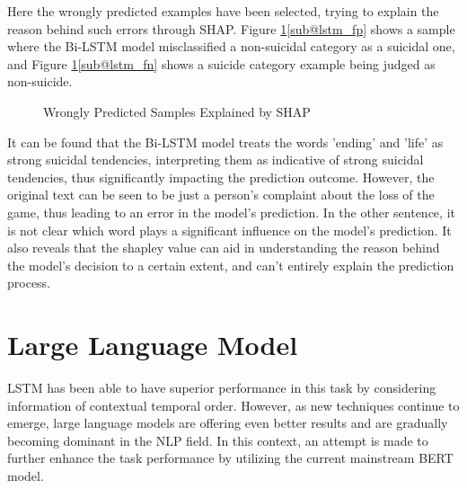 \documentclass[ %
                    author={Bocheng Wang},
                supervisor={Dr. Qiang Liu},
                    degree={MSc},
                     title={A Research on Identification of Suicide Ideation in Texts with Multiple Models},
                      type={},
                      year={2024}]{dissertation}
\begin{document}
Here the wrongly predicted examples have been selected, trying to explain the reason behind such errors through SHAP. Figure \ref{fig:lstmshap}\ref{sub@lstm_fp} shows a sample where the Bi-LSTM model misclassified a non-suicidal category as a suicidal one, and Figure \ref{fig:lstmshap}\ref{sub@lstm_fn} shows a suicide category example being judged as non-suicide.

\begin{figure}[!h]
      \centering
      \hfil
      \caption{Wrongly Predicted Samples Explained by SHAP}
      \label{fig:lstmshap}
\end{figure}

It can be found that the Bi-LSTM model treats the words 'ending' and 'life' as strong suicidal tendencies, interpreting them as indicative of strong suicidal tendencies, thus significantly impacting the prediction outcome. However, the original text can be seen to be just a person's complaint about the loss of the game, thus leading to an error in the model's prediction. In the other sentence, it is not clear which word plays a significant influence on the model's prediction. It also reveals that the shapley value can aid in understanding the reason behind the model's decision to a certain extent, and can't entirely explain the prediction process.

\section{Large Language Model}
\noindent
LSTM has been able to have superior performance in this task by considering information of contextual temporal order. However, as new techniques continue to emerge, large language models are offering even better results and are gradually becoming dominant in the NLP field. In this context, an attempt is made to further enhance the task performance by utilizing the current mainstream BERT model.
\end{document}
